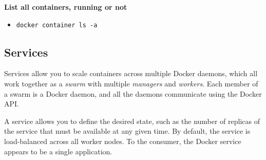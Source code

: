 \documentclass{article}
\begin{document}
\textbf{List all containers, running or not}

\begin{itemize}
  \item \texttt{docker container ls -a}
\end{itemize}

	\subsection{Services}

Services allow you to scale containers across multiple Docker daemons, which all work together as a \textit{swarm} with multiple \textit{managers} and \textit{workers}. Each member of a swarm is a Docker daemon, and all the daemons communicate using the Docker API.

A service allows you to define the desired state, such as the number of replicas of the service that must be available at any given time. By default, the service is load-balanced across all worker nodes. To the consumer, the Docker service appears to be a single application.
\end{document}
